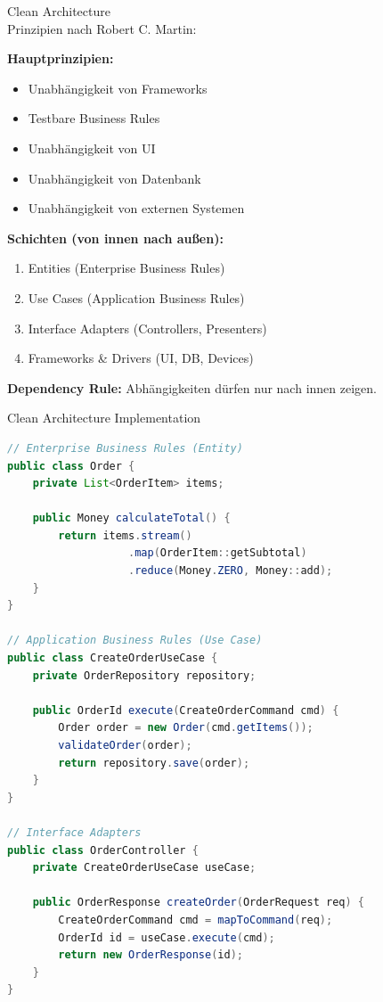 \begin{KR}{Clean Architecture}\\
Prinzipien nach Robert C. Martin:

\textbf{Hauptprinzipien:}
\begin{itemize}
    \item Unabhängigkeit von Frameworks
    \item Testbare Business Rules
    \item Unabhängigkeit von UI
    \item Unabhängigkeit von Datenbank
    \item Unabhängigkeit von externen Systemen
\end{itemize}

\textbf{Schichten (von innen nach außen):}
\begin{enumerate}
    \item Entities (Enterprise Business Rules)
    \item Use Cases (Application Business Rules)
    \item Interface Adapters (Controllers, Presenters)
    \item Frameworks \& Drivers (UI, DB, Devices)
\end{enumerate}

\textbf{Dependency Rule:}
Abhängigkeiten dürfen nur nach innen zeigen.
\end{KR}

\begin{example2}{Clean Architecture Implementation}\\
\begin{lstlisting}[language=Java, style=base]
// Enterprise Business Rules (Entity)
public class Order {
    private List<OrderItem> items;
    
    public Money calculateTotal() {
        return items.stream()
                   .map(OrderItem::getSubtotal)
                   .reduce(Money.ZERO, Money::add);
    }
}

// Application Business Rules (Use Case)
public class CreateOrderUseCase {
    private OrderRepository repository;
    
    public OrderId execute(CreateOrderCommand cmd) {
        Order order = new Order(cmd.getItems());
        validateOrder(order);
        return repository.save(order);
    }
}

// Interface Adapters
public class OrderController {
    private CreateOrderUseCase useCase;
    
    public OrderResponse createOrder(OrderRequest req) {
        CreateOrderCommand cmd = mapToCommand(req);
        OrderId id = useCase.execute(cmd);
        return new OrderResponse(id);
    }
}
\end{lstlisting}
\end{example2}

